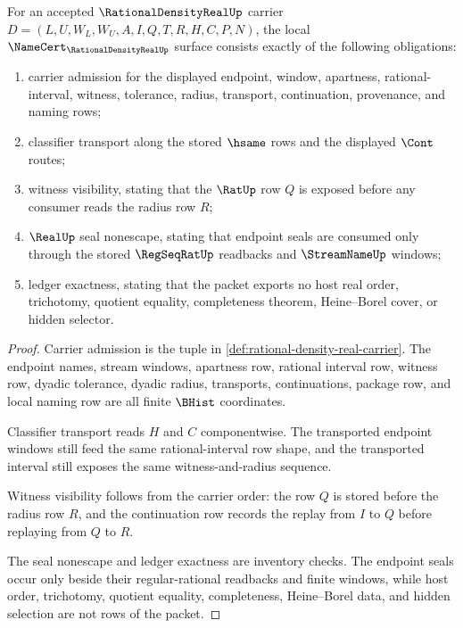 \begin{theorem}\label{thm:rational-density-real-namecert-obligation-surface}
For an accepted $\RationalDensityRealUp$ carrier $D=(L,U,W_L,W_U,A,I,Q,T,R,H,C,P,N)$, the local $\NameCert_{\RationalDensityRealUp}$ surface consists exactly of the following obligations:
\begin{enumerate}
\item carrier admission for the displayed endpoint, window, apartness, rational-interval, witness, tolerance, radius, transport, continuation, provenance, and naming rows;
\item classifier transport along the stored $\hsame$ rows and the displayed $\Cont$ routes;
\item witness visibility, stating that the $\RatUp$ row $Q$ is exposed before any consumer reads the radius row $R$;
\item $\RealUp$ seal nonescape, stating that endpoint seals are consumed only through the stored $\RegSeqRatUp$ readbacks and $\StreamNameUp$ windows;
\item ledger exactness, stating that the packet exports no host real order, trichotomy, quotient equality, completeness theorem, Heine--Borel cover, or hidden selector.
\end{enumerate}
\end{theorem}
\begin{proof}
Carrier admission is the tuple in \autoref{def:rational-density-real-carrier}. The endpoint names, stream windows, apartness row, rational interval row, witness row, dyadic tolerance, dyadic radius, transports, continuations, package row, and local naming row are all finite $\BHist$ coordinates.

Classifier transport reads $H$ and $C$ componentwise. The transported endpoint windows still feed the same rational-interval row shape, and the transported interval still exposes the same witness-and-radius sequence.

Witness visibility follows from the carrier order: the row $Q$ is stored before the radius row $R$, and the continuation row records the replay from $I$ to $Q$ before replaying from $Q$ to $R$.

The seal nonescape and ledger exactness are inventory checks. The endpoint seals occur only beside their regular-rational readbacks and finite windows, while host order, trichotomy, quotient equality, completeness, Heine--Borel data, and hidden selection are not rows of the packet.
\end{proof}

